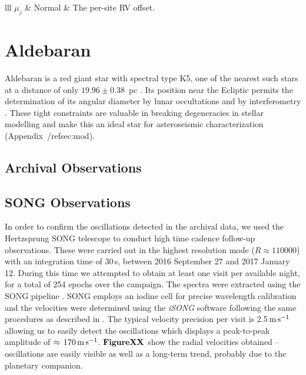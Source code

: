\documentclass[modern]{aastex61}
\begin{document}
\begin{deluxetable}{lll}
\startdata
$\mu_j$ & Normal & The per-site RV offset. \\
\enddata
{}
\end{deluxetable}

\section{Aldebaran}
Aldebaran is a red giant star with spectral type K5, one of the nearest such stars at a distance of only $19.96 \pm 0.38$~pc \citep{hipparcos}. Its position near the Ecliptic permits the determination of its angular diameter by lunar occultations and by interferometry \citep[$20.58 \pm 0.03$ mas;][]{richichi2005,1979ApJ...228L.111B,brown1979,panek1980}. These tight constraints are valuable in breaking degeneracies in stellar modelling and make this an ideal star for asteroseismic characterization (Appendix~/ref{sec:mod}).

\subsection{Archival Observations}
\label{sec:archival-obs}

\subsection{SONG Observations}    %

In order to confirm the oscillations detected in the archival data, we used the Hertzsprung SONG telescope \citep{2017ApJ...836..142G} to conduct high time cadence follow-up observations. These were carried out in the highest resolution mode ($R\approx110000$)
with an integration time of 30\,s, between 2016 September 27 and 2017 January 12. During this time we attempted to obtain at least one
visit per available night, for a total of 254 epochs over the campaign. The spectra were
extracted using the SONG pipeline \citep[see][]{2017ApJ...836..142G}. SONG employs an iodine cell for
precise wavelength calibration and the velocities were determined using the \textit{iSONG}
software following the same procedures as described in \cite{2017ApJ...836..142G}. The typical
velocity precision per visit is 2.5$\,\rm m\,s^{-1}$ allowing us to easily detect the oscillations
which displays a peak-to-peak amplitude of $\approx \, 170 \, \rm m \, s^{-1}$. $\bf Figure XX$ show
the radial velocities obtained -- oscillations are easily visible as well as a long-term
trend, probably due to the planetary companion.
\end{document}
